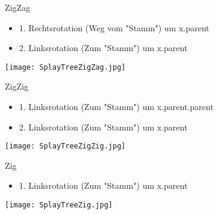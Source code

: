 			\begin{center}
				ZigZag
			\end{center}
			\begin{minipage}{0.5\textwidth}
				\begin{itemize}
					\item 1. Rechtsrotation (Weg vom "Stamm") um x.parent
					\item 2. Linksrotation (Zum "Stamm") um x.parent
				\end{itemize}
			\end{minipage}
			\hspace{1cm}
			\begin{minipage}{0.45\textwidth}
				\begin{center}
					\texttt{[image: SplayTreeZigZag.jpg]}
				\end{center}
			\end{minipage}
			\begin{center}
				\centerline{\noindent\makebox[0.5\linewidth]{\rule{0.5\paperwidth}{0.4pt}}}
			\end{center}
			\centerline{ZigZig}
			\begin{minipage}{0.5\textwidth}
				\begin{itemize}
					\item 1. Linksrotation (Zum "Stamm") um x.parent.parent
					\item 2. Linksrotation (Zum "Stamm") um x.parent
				\end{itemize}
			\end{minipage}
			\hspace{1cm}
			\begin{minipage}{0.45\textwidth}
				\begin{center}
					\texttt{[image: SplayTreeZigZig.jpg]}
				\end{center}
			\end{minipage}
			\begin{center}
				\centerline{\noindent\makebox[0.5\linewidth]{\rule{0.5\paperwidth}{0.4pt}}}
			\end{center}
			\centerline{Zig}
			\begin{minipage}{0.5\textwidth}
				\begin{itemize}
					\item 1. Linksrotation (Zum "Stamm") um x.parent
				\end{itemize}
			\end{minipage}
			\hspace{1cm}
			\begin{minipage}{0.45\textwidth}
				\begin{center}
					\texttt{[image: SplayTreeZig.jpg]}
				\end{center}
			\end{minipage}


